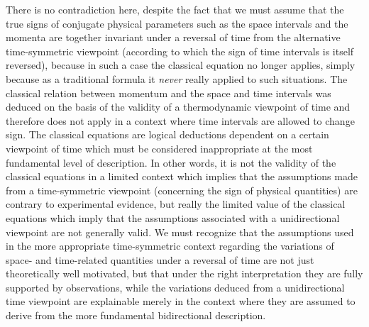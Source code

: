 \documentclass[notitlepage,12pt]{report}
\begin{document}
There is no contradiction here, despite the fact that we must assume that the true signs of conjugate physical parameters such as the space intervals and the momenta are together invariant under a reversal of time from the alternative time-symmetric viewpoint (according to which the sign of time intervals is itself reversed), because in such a case the classical equation no longer applies, simply because as a traditional formula it \textit{never} really applied to such situations. The classical relation between momentum and the space and time intervals was deduced on the basis of the validity of a thermodynamic viewpoint of time and therefore does not apply in a context where time intervals are allowed to change sign. The classical equations are logical deductions dependent on a certain viewpoint of time which must be considered inappropriate at the most fundamental level of description. In other words, it is not the validity of the classical equations in a limited context which implies that the assumptions made from a time-symmetric viewpoint (concerning the sign of physical quantities) are contrary to experimental evidence, but really the limited value of the classical equations which imply that the assumptions associated with a unidirectional viewpoint are not generally valid. We must recognize that the assumptions used in the more appropriate time-symmetric context regarding the variations of space- and time-related quantities under a reversal of time are not just theoretically well motivated, but that under the right interpretation they are fully supported by observations, while the variations deduced from a unidirectional time viewpoint are explainable merely in the context where they are assumed to derive from the more fundamental bidirectional description.
\end{document}
